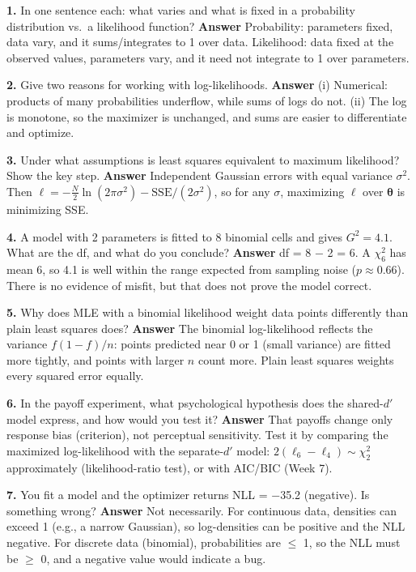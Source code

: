 \textbf{1.} In one sentence each: what varies and what is fixed in a
probability distribution vs.~a likelihood function? \textbf{Answer}
Probability: parameters fixed, data vary, and it sums/integrates to 1
over data. Likelihood: data fixed at the observed values, parameters
vary, and it need not integrate to 1 over parameters.

\textbf{2.} Give two reasons for working with log-likelihoods.
\textbf{Answer} (i) Numerical: products of many probabilities underflow,
while sums of logs do not. (ii) The log is monotone, so the maximizer is
unchanged, and sums are easier to differentiate and optimize.

\textbf{3.} Under what assumptions is least squares equivalent to
maximum likelihood? Show the key step. \textbf{Answer} Independent
Gaussian errors with equal variance \(\sigma^2\). Then
\(\ell = -\tfrac{N}{2}\ln(2\pi\sigma^2) - \mathrm{SSE}/(2\sigma^2)\), so
for any \(\sigma\), maximizing \(\ell\) over \(\boldsymbol\theta\) is
minimizing SSE.

\textbf{4.} A model with 2 parameters is fitted to 8 binomial cells and
gives \(G^2 = 4.1\). What are the df, and what do you conclude?
\textbf{Answer} df = 8 − 2 = 6. A \(\chi^2_6\) has mean 6, so 4.1 is
well within the range expected from sampling noise (\(p \approx 0.66\)).
There is no evidence of misfit, but that does not prove the model
correct.

\textbf{5.} Why does MLE with a binomial likelihood weight data points
differently than plain least squares does? \textbf{Answer} The binomial
log-likelihood reflects the variance \(f(1-f)/n\): points predicted near
0 or 1 (small variance) are fitted more tightly, and points with larger
\(n\) count more. Plain least squares weights every squared error
equally.

\textbf{6.} In the payoff experiment, what psychological hypothesis does
the shared-\(d'\) model express, and how would you test it?
\textbf{Answer} That payoffs change only response bias (criterion), not
perceptual sensitivity. Test it by comparing the maximized
log-likelihood with the separate-\(d'\) model:
\(2(\ell_6 - \ell_4) \sim \chi^2_2\) approximately (likelihood-ratio
test), or with AIC/BIC (Week 7).

\textbf{7.} You fit a model and the optimizer returns NLL = −35.2
(negative). Is something wrong? \textbf{Answer} Not necessarily. For
continuous data, densities can exceed 1 (e.g., a narrow Gaussian), so
log-densities can be positive and the NLL negative. For discrete data
(binomial), probabilities are \ensuremath{\leq} 1, so the NLL must be \ensuremath{\geq} 0, and a
negative value would indicate a bug.

